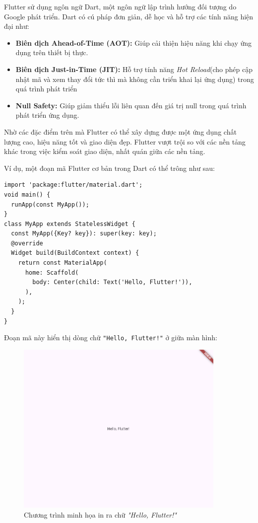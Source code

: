 \documentclass[../DoAn.tex]{subfiles}
\numberwithin{figure}{chapter}
\begin{document}
Flutter sử dụng ngôn ngữ Dart, một ngôn ngữ lập trình hướng đối tượng do Google phát triển. Dart có cú pháp đơn giản, dễ học và hỗ trợ các tính năng hiện đại như:
\begin{itemize}
    \item \textbf{Biên dịch Ahead-of-Time (AOT):} Giúp cải thiện hiệu năng khi chạy ứng dụng trên thiết bị thực.
    \item \textbf{Biên dịch Just-in-Time (JIT):} Hỗ trợ tính năng \textit{Hot Reload}(cho phép cập nhật mã và xem thay đổi tức thì mà không cần triển khai lại ứng dụng) trong quá trình phát triển
    \item \textbf{Null Safety:} Giúp giảm thiểu lỗi liên quan đến giá trị null trong quá trình phát triển ứng dụng.
\end{itemize}

Nhờ các đặc điểm trên mà Flutter có thể xây dựng được một ứng dụng chất lượng cao, hiệu năng tốt và giao diện đẹp. Flutter vượt trội so với các nền tảng khác trong việc kiểm soát giao diện, nhất quán giữa các nền tảng.

Ví dụ, một đoạn mã Flutter cơ bản trong Dart có thể trông như sau:
\begin{lstlisting}
import 'package:flutter/material.dart';
void main() {
  runApp(const MyApp());
}
class MyApp extends StatelessWidget {
  const MyApp({Key? key}): super(key: key);
  @override
  Widget build(BuildContext context) {
    return const MaterialApp(
      home: Scaffold(
        body: Center(child: Text('Hello, Flutter!')),
      ),
    );
  }
}
\end{lstlisting}

Đoạn mã này hiển thị dòng chữ \texttt{"Hello, Flutter!"} ở giữa màn hình:
\begin{figure}[H]
    \centering
    \includegraphics[width=0.9\textwidth]{Hinhve/helloflutter.png}
    \caption{Chương trình minh họa in ra chữ \textit{"Hello, Flutter!"}}
    \label{fig:flutterimg}
\end{figure}
\end{document}
